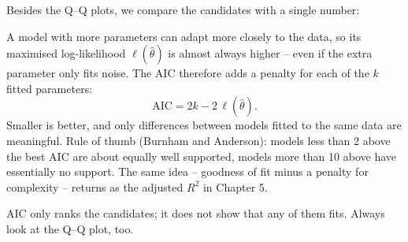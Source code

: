 \documentclass[
  letterpaper,
  DIV=11,
  numbers=noendperiod]{scrreprt}
\begin{document}
Besides the Q--Q plots, we compare the candidates with a single number:

\begin{tcolorbox}[enhanced jigsaw, left=2mm, title=\textcolor{quarto-callout-note-color}{\faInfo}\hspace{0.5em}{Definition: Akaike information criterion (AIC)}, opacityback=0, breakable, rightrule=.15mm, arc=.35mm, toptitle=1mm, colbacktitle=quarto-callout-note-color!10!white, opacitybacktitle=0.6, coltitle=black, colframe=quarto-callout-note-color-frame, bottomrule=.15mm, leftrule=.75mm, bottomtitle=1mm, titlerule=0mm, toprule=.15mm, colback=white]

A model with more parameters can adapt more closely to the data, so its
maximised log-likelihood \(\ell(\hat\theta)\) is almost always higher --
even if the extra parameter only fits noise. The AIC therefore adds a
penalty for each of the \(k\) fitted parameters:
\[\mathrm{AIC} = 2k - 2\,\ell(\hat\theta).\] Smaller is better, and only
differences between models fitted to the same data are meaningful. Rule
of thumb (Burnham and Anderson): models less than 2 above the best AIC
are about equally well supported, models more than 10 above have
essentially no support. The same idea -- goodness of fit minus a penalty
for complexity -- returns as the adjusted \(R^2\) in Chapter 5.

AIC only ranks the candidates; it does not show that any of them fits.
Always look at the Q--Q plot, too.

\end{tcolorbox}
\end{document}
